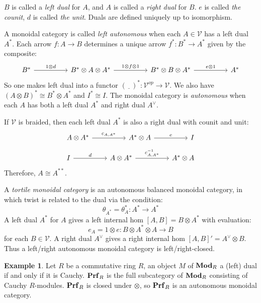 \documentclass[8pt]{article}
\theoremstyle{definition}
\theoremstyle{definition}
\theoremstyle{definition}
\theoremstyle{definition}
\theoremstyle{definition}
\theoremstyle{definition}
\theoremstyle{definition}
\theoremstyle{definition}
\theoremstyle{definition}
\theoremstyle{definition}
\theoremstyle{definition}
\theoremstyle{definition}
\newtheorem{example}{Example}[section]
\theoremstyle{definition}
\theoremstyle{definition}
\theoremstyle{question}
\begin{document}
  $B$ is called a \emph{left dual} for $A$, and $A$ is called a \emph{right dual} for $B$. $e$ is called \emph{the counit}, $d$ is called \emph{the unit}. Duals
  are defined uniquely up to isomorphism.

  A monoidal category is called \emph{left autonomous} when each $A \in \mathcal{V}$ has a left dual $A^*$. Each arrow $f : A \to B$ determines a unique arrow $f^* : B^* \to A^*$
  given by the composite:
  \[
  \begin{tikzcd}
    B^* \ar[rr, "1 \otimes d"] && B^* \otimes A \otimes A^* \ar[rr, "1 \otimes f \otimes 1"] && B^* \otimes B \otimes A^* \ar[rr, "e \otimes 1"] && A^*
  \end{tikzcd}
  \]
  So one makes left dual into a functor $(\underline{\:\:\:})^* : \mathcal{V}^{op} \to \mathcal{V}$. We also have $(A \otimes B)^* \cong B^* \otimes A^*$ 
  and $I^* \cong I$. The monoidal category is \emph{autonomous} when each $A$ has both a left dual $A^*$ and right dual $A^{\vee}$.

  If $\mathcal{V}$ is braided, then each left dual $A^*$ is also a right dual with counit and unit:
  \[
  \begin{tikzcd}
    A \otimes A^{*} \ar[rr, "c_{A,A^*}"] && A^{*} \otimes A \ar[rr, "e"] && I
  \end{tikzcd}
  \]
  \[
  \begin{tikzcd}
    I \ar[rr, "d"] && A \otimes A^{*} \ar[rr, "c^{-1}_{A,A^*}"] && A^{*} \otimes A
  \end{tikzcd}
  \]
  Therefore, $A \cong A^{**}$.

  A \emph{tortile monoidal category} is an autonomous balanced monoidal category, in which twist is related to the dual via the condition:
  \[
  \theta_{A^*} = \theta^*_A : A^* \to A^{*}
  \]
  A left dual $A^*$ for $A$ gives a left internal hom $[A, B] = B \otimes A^*$ with evaluation:
  \[
  e_A = 1 \otimes e : B \otimes A^* \otimes A \to B
  \]
  for each $B \in \mathcal{V}$. A right dual $A^{\vee}$ gives a right internal hom $[A,B]' = A^{\vee} \otimes B$. Thus a left/right autonomous monoidal category
  is left/right-closed.

  \begin{example}
    Let $R$ be a commutative ring $R$, an object $M$ of ${\bf Mod}_R$ a (left) dual if and only if it is Cauchy. ${\bf Prf}_R$ is the full subcategory
    of ${\bf Mod}_R$ consisting of Cauchy $R$-modules. ${\bf Prf}_R$ is closed under $\otimes$, so ${\bf Prf}_R$ is an autonomous monoidal category.
  \end{example}
\end{document}
